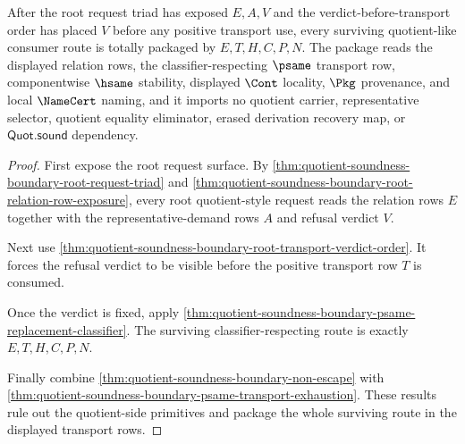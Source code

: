 \begin{theorem}
\label{thm:quotient-soundness-boundary-root-transport-package-totality}
After the root request triad has exposed $E,A,V$ and the verdict-before-transport order has placed $V$ before any positive transport use, every surviving quotient-like consumer route is totally packaged by $E,T,H,C,P,N$. The package reads the displayed relation rows, the classifier-respecting $\psame$ transport row, componentwise $\hsame$ stability, displayed $\Cont$ locality, $\Pkg$ provenance, and local $\NameCert$ naming, and it imports no quotient carrier, representative selector, quotient equality eliminator, erased derivation recovery map, or $\mathsf{Quot.sound}$ dependency.
\end{theorem}
\begin{proof}
First expose the root request surface. By \autoref{thm:quotient-soundness-boundary-root-request-triad} and \autoref{thm:quotient-soundness-boundary-root-relation-row-exposure}, every root quotient-style request reads the relation rows $E$ together with the representative-demand rows $A$ and refusal verdict $V$.

Next use \autoref{thm:quotient-soundness-boundary-root-transport-verdict-order}. It forces the refusal verdict to be visible before the positive transport row $T$ is consumed.

Once the verdict is fixed, apply \autoref{thm:quotient-soundness-boundary-psame-replacement-classifier}. The surviving classifier-respecting route is exactly $E,T,H,C,P,N$.

Finally combine \autoref{thm:quotient-soundness-boundary-non-escape} with \autoref{thm:quotient-soundness-boundary-psame-transport-exhaustion}. These results rule out the quotient-side primitives and package the whole surviving route in the displayed transport rows.
\end{proof}

